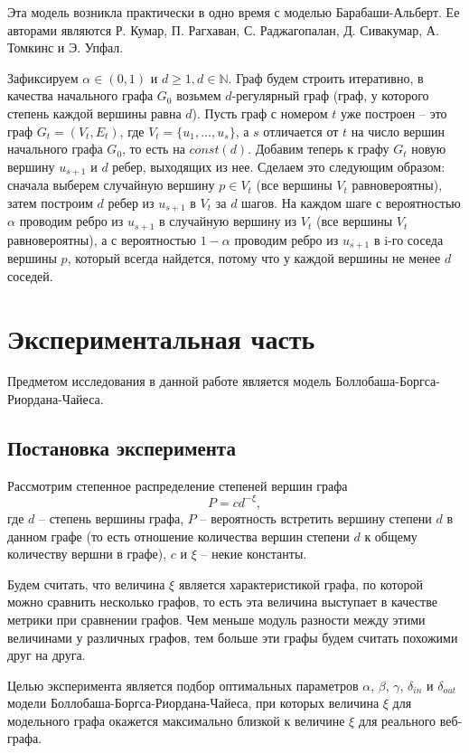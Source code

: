 \documentclass[14pt]{extreport}
\begin{document}
Эта модель возникла практически в одно время с моделью Барабаши-Альберт. Ее авторами являются Р. Кумар, П. Рагхаван, С. Раджагопалан, Д. Сивакумар, А. Томкинс и Э. Упфал.

Зафиксируем $\alpha \in (0,1)$ и $d \ge 1, d \in \mathbb{N}$. Граф будем строить итеративно, в качества начального графа $G_0$ возьмем $d$-регулярный граф (граф, у которого степень каждой вершины равна $d$). Пусть граф с номером $t$ уже построен -- это граф $G_t = (V_t, E_t)$, где $V_t = \{u_1, \dots, u_s\}$, а $s$ отличается от $t$ на число вершин начального графа $G_0$, то есть на $const(d)$. Добавим теперь к графу $G_t$ новую вершину $u_{s+1}$ и $d$ ребер, выходящих из нее. Сделаем это следующим образом: сначала выберем случайную вершину $p \in V_t$ (все вершины $V_t$ равновероятны), затем построим $d$ ребер из $u_{s+1}$ в $V_t$ за $d$ шагов. На каждом шаге с вероятностью $\alpha$ проводим ребро из $u_{s+1}$ в случайную вершину из $V_t$ (все вершины $V_t$ равновероятны), а с вероятностью $1-\alpha$ проводим ребро из $u_{s+1}$ в i-го соседа вершины $p$, который всегда найдется, потому что у каждой вершины не менее $d$ соседей. 

\chapter{Экспериментальная часть}

Предметом исследования в данной работе является модель Боллобаша-Боргса-Риордана-Чайеса.

\section{Постановка эксперимента}

Рассмотрим степенное распределение степеней вершин графа
$$
P = c d^{-\xi},
$$
где $d$ -- степень вершины графа, $P$ -- вероятность встретить вершину степени $d$ в данном графе (то есть отношение количества вершин степени $d$ к общему количеству вершни в графе), $c$ и $\xi$ -- некие константы.

Будем считать, что величина $\xi$ является характеристикой графа, по которой можно сравнить несколько графов, то есть эта величина выступает в качестве метрики при сравнении графов. Чем меньше модуль разности между этими величинами у различных графов, тем больше эти графы будем считать похожими друг на друга.

Целью эксперимента является подбор оптимальных параметров $\alpha$, $\beta$, $\gamma$, $\delta_{in}$ и $\delta_{out}$ модели Боллобаша-Боргса-Риордана-Чайеса, при которых величина $\xi$ для модельного графа окажется максимально близкой к величине $\xi$ для реального веб-графа.
\end{document}
